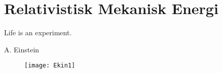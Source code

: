 \chapter{Relativistisk Mekanisk Energi}
\label{sec:RelativistiskMekaniskEnergi}
\epigraph{Life is an experiment.}{A. Einstein}
\minitoc
\clearpage


\begin{figure}[h]
	\centering
%	
	\texttt{[image: Ekin1]}
\end{figure}

\lipsum